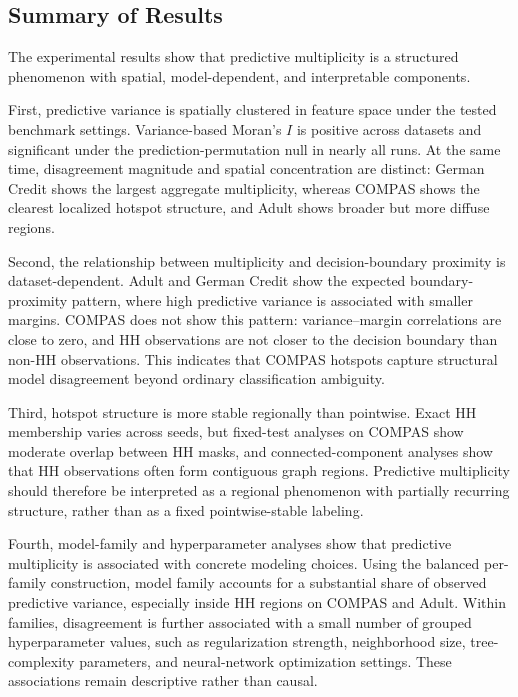 \subsection{Summary of Results}

The experimental results show that predictive multiplicity is a structured phenomenon with spatial, 
model-dependent, and interpretable components.

First, predictive variance is spatially clustered in feature space under the tested benchmark
settings. Variance-based Moran's \(I\) is positive across datasets and significant under the
prediction-permutation null in nearly all runs. At the same time, disagreement magnitude
and spatial concentration are distinct: German Credit shows the largest aggregate
multiplicity, whereas COMPAS shows the clearest localized hotspot structure, and Adult
shows broader but more diffuse regions.

Second, the relationship between multiplicity and decision-boundary proximity is
dataset-dependent. Adult and German Credit show the expected boundary-proximity
pattern, where high predictive variance is associated with smaller margins. COMPAS does
not show this pattern: variance--margin correlations are close to zero, and HH observations
are not closer to the decision boundary than non-HH observations. This indicates that
COMPAS hotspots capture structural model disagreement beyond ordinary
classification ambiguity.

Third, hotspot structure is more stable regionally than pointwise. Exact HH membership
varies across seeds, but fixed-test analyses on COMPAS show moderate overlap between
HH masks, and connected-component analyses show that HH observations often form
contiguous graph regions. Predictive multiplicity should therefore be interpreted as a
regional phenomenon with partially recurring structure, rather than as a fixed
pointwise-stable labeling.

Fourth, model-family and hyperparameter analyses show that predictive multiplicity is
associated with concrete modeling choices. Using the balanced per-family construction,
model family accounts for a substantial share of observed predictive variance, especially
inside HH regions on COMPAS and Adult. Within families, disagreement is further
associated with a small number of grouped hyperparameter values, such as regularization
strength, neighborhood size, tree-complexity parameters, and neural-network optimization
settings. These associations remain descriptive rather than causal.

